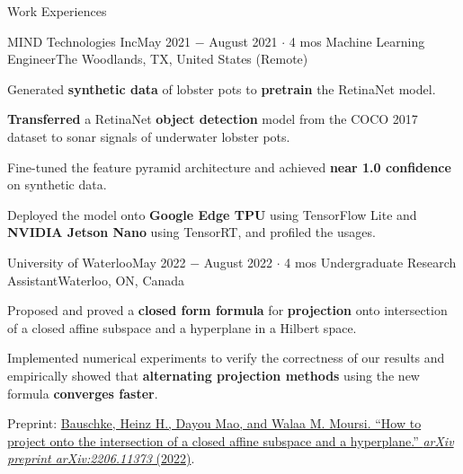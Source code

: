 \documentclass{resume}
\begin{document}
\begin{rSection}{Work Experiences}
    \begin{rSubsection}{MIND Technologies Inc}{May 2021 \(-\) August 2021 \(\cdot\) 4 mos}
        {Machine Learning Engineer}{The Woodlands, TX, United States (Remote)}
        \item Generated \textbf{synthetic data} of lobster pots to \textbf{pretrain} the RetinaNet model.
        \item \textbf{Transferred} a RetinaNet \textbf{object detection} model
        from the COCO 2017 dataset to sonar signals of underwater lobster pots.
        \item Fine-tuned the feature pyramid architecture and achieved \textbf{near 1.0 confidence} on synthetic data.
        \item Deployed the model onto \textbf{Google Edge TPU} using TensorFlow Lite
        and \textbf{NVIDIA Jetson Nano} using TensorRT,
        and profiled the usages.
    \end{rSubsection}

    \begin{rSubsection}{University of Waterloo}{May 2022 \(-\) August 2022 \(\cdot\) 4 mos}
        {Undergraduate Research Assistant}{Waterloo, ON, Canada}
        \item Proposed and proved a \textbf{closed form formula} for \textbf{projection} onto intersection of a closed affine subspace and a hyperplane in a Hilbert space.
        \item Implemented numerical experiments to verify the correctness of our results
        and empirically showed that \textbf{alternating projection methods} using the new formula \textbf{converges faster}.
        \item Preprint: \href{https://arxiv.org/abs/2206.11373}
        {Bauschke, Heinz H., Dayou Mao, and Walaa M. Moursi. ``How to project onto the intersection of a closed affine subspace and a hyperplane.'' \textit{arXiv preprint arXiv:2206.11373} (2022)}.
    \end{rSubsection}

\end{rSection}
\end{document}
